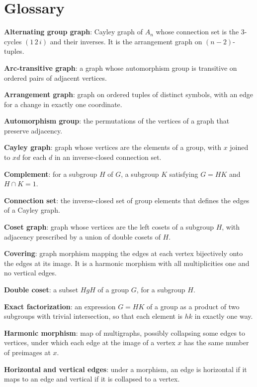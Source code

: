 \documentclass[12pt,letterpaper]{article}
\numberwithin{equation}{section}
\theoremstyle{definition}
\begin{document}
\section*{Glossary}
\noindent\textbf{Alternating group graph}: Cayley graph of $A_n$ whose connection set is the $3$-cycles $(1\,2\,i)$ and their inverses. It is the arrangement graph on $(n-2)$-tuples.\par
\noindent\textbf{Arc-transitive graph}: a graph whose automorphism group is transitive on ordered pairs of adjacent vertices.\par
\noindent\textbf{Arrangement graph}: graph on ordered tuples of distinct symbols, with an edge for a change in exactly one coordinate.\par
\noindent\textbf{Automorphism group}: the permutations of the vertices of a graph that preserve adjacency.\par
\noindent\textbf{Cayley graph}: graph whose vertices are the elements of a group, with $x$ joined to $xd$ for each $d$ in an inverse-closed connection set.\par
\noindent\textbf{Complement}: for a subgroup $H$ of $G$, a subgroup $K$ satisfying $G=HK$ and $H\cap K=1$.\par
\noindent\textbf{Connection set}: the inverse-closed set of group elements that defines the edges of a Cayley graph.\par
\noindent\textbf{Coset graph}: graph whose vertices are the left cosets of a subgroup $H$, with adjacency prescribed by a union of double cosets of $H$.\par
\noindent\textbf{Covering}: graph morphism mapping the edges at each vertex bijectively onto the edges at its image. It is a harmonic morphism with all multiplicities one and no vertical edges.\par
\noindent\textbf{Double coset}: a subset $HgH$ of a group $G$, for a subgroup $H$.\par
\noindent\textbf{Exact factorization}: an expression $G=HK$ of a group as a product of two subgroups with trivial intersection, so that each element is $hk$ in exactly one way.\par
\noindent\textbf{Harmonic morphism}: map of multigraphs, possibly collapsing some edges to vertices, under which each edge at the image of a vertex $x$ has the same number of preimages at $x$.\par
\noindent\textbf{Horizontal and vertical edges}: under a morphism, an edge is horizontal if it maps to an edge and vertical if it is collapsed to a vertex.\par
\end{document}
